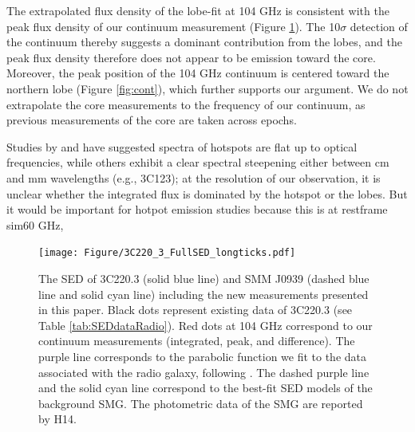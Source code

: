 \documentclass[twocolumn,apj,numberedappendix]{emulateapj}
\begin{document}
The extrapolated flux density of the lobe-fit at 104 GHz is consistent with the peak flux density of our continuum measurement (Figure \ref{fig:SED}). The 10$\sigma$ detection of the continuum thereby suggests
a dominant contribution from the lobes, and the peak flux density therefore does not appear to be emission toward the core. Moreover, the peak position of the 104 GHz continuum is
centered toward the northern lobe (Figure \ref{fig:cont}), which further supports our argument. 
We do not extrapolate the core measurements to the frequency of our continuum, as previous measurements of the core are taken 
across epochs.

Studies by \citet{Meisenheimer89a} and \citet{Hardcastle08a} have suggested spectra of hotspots are flat up to optical frequencies, while others exhibit a clear spectral steepening either between cm and mm wavelengths (e.g., 3C123); at the resolution of our observation, it is unclear whether the integrated flux is dominated by the hotspot or the lobes. But it would be important for hotpot emission studies because this is at restframe sim60 GHz,  


\begin{figure}[!tbph]
\centering
\texttt{[image: Figure/3C220\_3\_FullSED\_longticks.pdf]}
\caption{The SED of 3C220.3 (solid blue line) and SMM J0939 (dashed blue line and solid cyan line) including the new measurements presented in this paper. 
Black dots represent existing data of 3C220.3 (see Table \ref{tab:SEDdataRadio}). Red dots at 104 GHz correspond to 
our continuum measurements (integrated, peak, and difference). The purple line corresponds to the parabolic function we 
fit to the data associated with the radio galaxy, following \citet{Cleary07a}. The dashed purple line and 
the solid cyan line correspond to the best-fit SED models of the background SMG. The photometric data of the SMG are reported by H14. \label{fig:SED}}
\end{figure}
\end{document}
